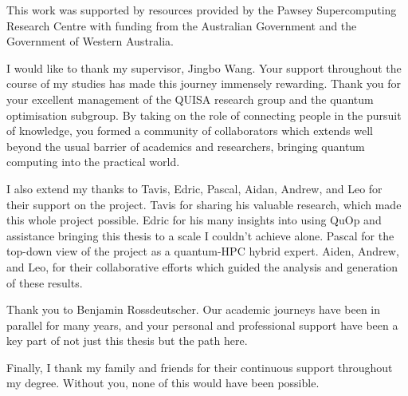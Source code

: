 This work was supported by resources provided by the Pawsey Supercomputing Research Centre with funding from the Australian Government and the Government of Western Australia.

I would like to thank my supervisor, Jingbo Wang. Your support throughout the course of my studies has made this journey immensely rewarding. Thank you for your excellent management of the QUISA research group and the quantum optimisation subgroup. By taking on the role of connecting people in the pursuit of knowledge, you formed a community of collaborators which extends well beyond the usual barrier of academics and researchers, bringing quantum computing into the practical world.

I also extend my thanks to Tavis, Edric, Pascal, Aidan, Andrew, and Leo for their support on the project. Tavis for sharing his valuable research, which made this whole project possible. Edric for his many insights into using QuOp and assistance bringing this thesis to a scale I couldn't achieve alone. Pascal for the top-down view of the project as a quantum-HPC hybrid expert. Aiden, Andrew, and Leo, for their collaborative efforts which guided the analysis and generation of these results.

Thank you to Benjamin Rossdeutscher. Our academic journeys have been in parallel for many years, and your personal and professional support have been a key part of not just this thesis but the path here.

Finally, I thank my family and friends for their continuous support throughout my degree. Without you, none of this would have been possible.
